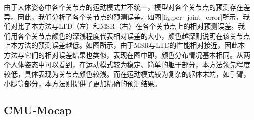 由于人体姿态中各个关节点的运动模式并不统一，模型对各个关节点的预测存在差异。因此，我们分析了各个关节点的预测误差。如图\ref{fig:per_joint_error}所示，我们对比了本方法与LTD（左）和MSR（右）在各个关节点上的相对预测误差。我们用各个关节点颜色的深浅程度代表相对误差的大小，颜色越深则说明在该关节点上本方法的预测误差越低。如图所示，由于MSR与LTD的性能相对接近，因此本方法与它们的相对误差结果也类似，表现在图中即，颜色分布情况基本相同。从两个人体姿态中可以看到，在运动模式较为稳定、简单的躯干部分，本方法领先程度较低，具体表现为关节点颜色较浅。而在运动模式较为复杂的躯体末端，如手臂，小腿等部分，本方法则提供了更加精确的预测结果。


\subsection{CMU-Mocap}


